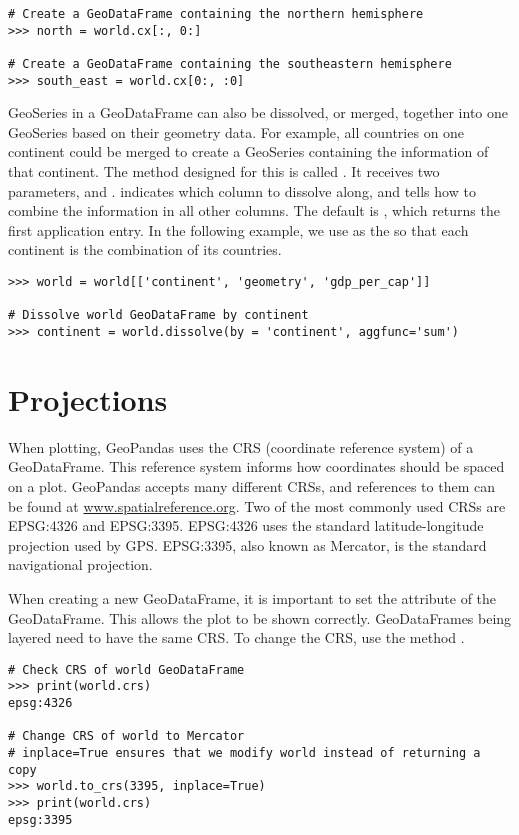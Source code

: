 \begin{lstlisting}
# Create a GeoDataFrame containing the northern hemisphere
>>> north = world.cx[:, 0:]

# Create a GeoDataFrame containing the southeastern hemisphere
>>> south_east = world.cx[0:, :0]
\end{lstlisting}

GeoSeries in a GeoDataFrame can also be dissolved, or merged, together into one GeoSeries based on their geometry data.
For example, all countries on one continent could be merged to create a GeoSeries containing the information of that continent.
The method designed for this is called .
It receives two parameters,  and .
 indicates which column to dissolve along, and  tells how to combine the information in all other columns.
The default  is , which returns the first application entry.
In the following example, we use  as the  so that each continent is the combination of its countries.

\begin{lstlisting}
>>> world = world[['continent', 'geometry', 'gdp_per_cap']]

# Dissolve world GeoDataFrame by continent
>>> continent = world.dissolve(by = 'continent', aggfunc='sum')
\end{lstlisting}


\section*{Projections} %

When plotting, GeoPandas uses the CRS (coordinate reference system) of a GeoDataFrame.
This reference system informs how coordinates should be spaced on a plot.
GeoPandas accepts many different CRSs, and references to them can be found at \url{www.spatialreference.org}.
Two of the most commonly used CRSs are EPSG:4326 and EPSG:3395.
EPSG:4326 uses the standard latitude-longitude projection used by GPS.
EPSG:3395, also known as Mercator, is the standard navigational projection.

When creating a new GeoDataFrame, it is important to set the  attribute of the GeoDataFrame.
This allows the plot to be shown correctly.
GeoDataFrames being layered need to have the same CRS.
To change the CRS, use the method .

\begin{lstlisting}
# Check CRS of world GeoDataFrame
>>> print(world.crs)
epsg:4326

# Change CRS of world to Mercator
# inplace=True ensures that we modify world instead of returning a copy
>>> world.to_crs(3395, inplace=True)
>>> print(world.crs)
epsg:3395
\end{lstlisting}

